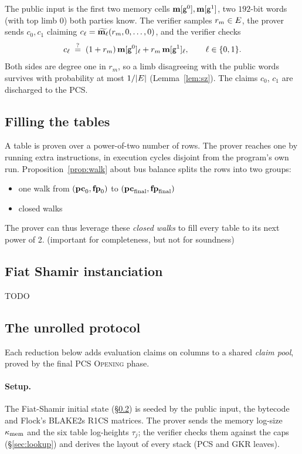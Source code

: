 The public input is the first two memory cells $\mathbf{m}[\mathsf{g}^{0}],\mathbf{m}[\mathsf{g}^{1}]$, two $192$-bit words (with top limb $0$) both parties know. The verifier samples $r_m\in E$, the prover sends $c_0,c_1$ claiming $c_\ell=\widetilde{\mathbf{m}_\ell}(r_m,0,\dots,0)$, and the verifier checks
\[
  c_\ell\;\stackrel{?}{=}\;(1+r_m)\,\mathbf{m}[\mathsf{g}^{0}]_\ell+r_m\,\mathbf{m}[\mathsf{g}^{1}]_\ell,\qquad \ell\in\{0,1\}.
\]
Both sides are degree one in $r_m$, so a limb disagreeing with the public words survives with probability at most $1/|E|$ (Lemma~\ref{lem:sz}). The claims $c_0$, $c_1$ are discharged to the PCS.

\subsection{Filling the tables}\label{sec:e2e-pad}

A table is proven over a power-of-two number of rows. The prover reaches one by running extra instructions, in execution cycles disjoint from the program's own run. Proposition~\ref{prop:walk} about bus balance splits the rows into two groups:
\begin{itemize}
\item one walk from $(\mathbf{pc}_0,\mathbf{fp}_0)$ to $(\mathbf{pc}_{\mathrm{final}},\mathbf{fp}_{\mathrm{final}})$
\item closed walks
\end{itemize}
The prover can thus leverage these \emph{closed walks} to fill every table to its next power of 2. (important for completeness, but not for soundness)

\subsection{Fiat Shamir instanciation}\label{sec:e2e-fiat-shamir}

TODO

\subsection{The unrolled protocol}\label{sec:e2e-unrolled}

Each reduction below adds evaluation claims on columns to a shared \emph{claim pool}, proved by the final PCS \textsc{Opening} phase.

\paragraph{Setup.}


The Fiat-Shamir initial state (\S\ref{sec:e2e-fiat-shamir}) is seeded by the public input, the bytecode and Flock's BLAKE2s R1CS matrices. The prover sends the memory log-size $\kappa_{\mathrm{mem}}$ and the six table log-heights $\tau_j$; the verifier checks them against the caps (\S\ref{sec:lookup}) and derives the layout of every stack (PCS and GKR leaves).

